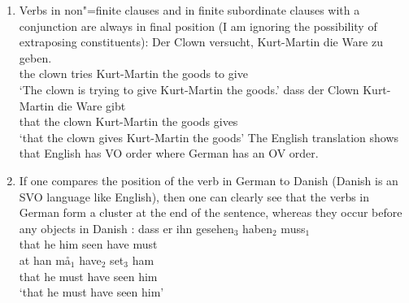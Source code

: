 \begin{enumerate}
\item Verbs in non"=finite clauses and in finite subordinate clauses with a conjunction are
always in final position (I am ignoring the possibility of extraposing constituents):
\eal
\ex 
\gll Der Clown versucht, Kurt-Martin die Ware zu geben.\\
     the clown tries Kurt-Martin the goods to give\\
\glt `The clown is trying to give Kurt-Martin the goods.'
\ex 
\gll dass der Clown Kurt-Martin die Ware gibt\\
	 that the clown Kurt-Martin the goods gives\\
\glt `that the clown gives Kurt-Martin the goods'
\zl
The English translation shows that English has VO order where German has an OV order.

\item If one compares the position of the verb in German to Danish (Danish is an SVO language
like English), then one can clearly see that the verbs in German form a cluster at the end of the sentence,
whereas they occur before any objects in Danish \citep{Oersnes2009b}:
\eal
\label{ex-VO-OV}
\ex 
\gll dass er ihn gesehen$_3$ haben$_2$ muss$_1$\\
	 that he him seen have must\\
\ex 
\gll at han må$_1$ have$_2$ set$_3$ ham\\
     that he must have seen him\\
\glt `that he must have seen him'
\zl



\end{enumerate}
